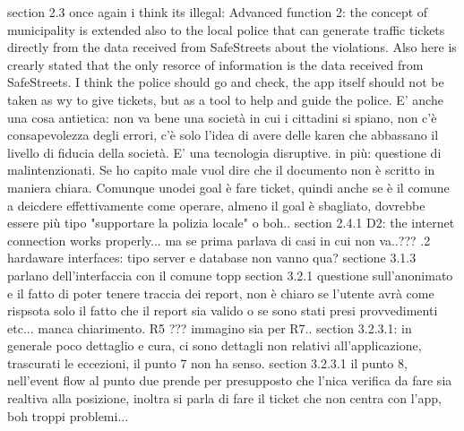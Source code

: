 \newline
section 2.3 once again i think its illegal: Advanced function 2: the concept of municipality is extended also to the local police that can
generate traffic tickets directly from the data received from SafeStreets about the violations. Also here is crearly stated that the only resorce of information is the data received from SafeStreets. I think the police should go and check, the app itself should not be taken as wy to give tickets, but as a tool to help and guide the police.\newline
E' anche una cosa antietica: non va bene una società in cui i cittadini si spiano, non c'è consapevolezza degli errori, c'è solo l'idea di avere delle karen che abbassano il livello di fiducia della società. E' una tecnologia disruptive.\newline
in più: questione di malintenzionati.\newline
Se ho capito male vuol dire che il documento non è scritto in maniera chiara.\newline
Comunque unodei goal è fare ticket, quindi anche se è il comune a deicdere effettivamente come operare, almeno il goal è sbagliato, dovrebbe essere più tipo "supportare la polizia locale" o boh..
\newline
section 2.4.1 D2: the internet connection works properly... ma se prima parlava di casi in cui non va..???\newline
{}.2 hardaware interfaces: tipo server e database non vanno qua?\newline
\newline
sectione 3.1.3 parlano dell'interfaccia con il comune topp \newline
\newline
section 3.2.1 questione sull'anonimato e il fatto di poter tenere traccia dei report, non è chiaro se l'utente avrà come rispsota solo il fatto che il report sia valido o se sono stati presi provvedimenti etc... manca chiarimento.\newline
R5 ??? immagino sia per R7.. \newline
\newline
section 3.2.3.1: in generale poco dettaglio e cura, ci sono dettagli non relativi all'applicazione, trascurati le eccezioni, il punto 7 non ha senso.\newline
\newline
section 3.2.3.1 il punto 8, nell'event flow al punto due prende per presupposto che l'nica verifica da fare sia realtiva alla posizione, inoltra si parla di fare il ticket che non centra con l'app, boh troppi problemi...\newline
